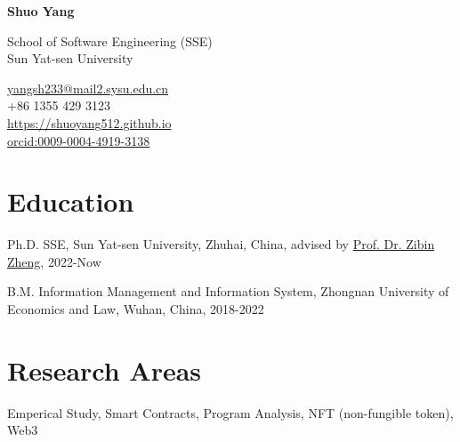 \documentclass[12pt,letterpaper]{report}
\newcommand{\myname}{Shuo Yang}
\newcommand{\namefont}[1]{{\normalfont\bfseries\Huge{#1}}}
\newcommand{\listitemspace}{0.25em}
\renewenvironment{itemize}
{\begin{list}{}{\setlength{\leftmargin}{0em}
                \setlength{\parskip}{0em}
                \setlength{\itemsep}{\listitemspace}
                \setlength{\parsep}{\listitemspace}}}
{\end{list}}
\begin{document}
    \raggedright{}

    \namefont{\myname}

    \vspace{1em}
    \begin{minipage}[t]{0.700\textwidth}
        School of Software Engineering (SSE)\\
        Sun Yat-sen University
    \end{minipage}
    \begin{minipage}[t]{0.295\textwidth}
        \flushright{}
        \href{yangsh233@mail2.sysu.edu.cn}{yangsh233@mail2.sysu.edu.cn} \\
        +86 1355 429 3123 \\
        \href{https://shuoyang512.github.io}{https://shuoyang512.github.io}\\
        \href{https://orcid.org/0009-0004-4919-3138}{orcid:0009-0004-4919-3138}
    \end{minipage}

    \section*{Education}
    
    \begin{tablist}
      \item[Ph.D.] \tab{}SSE, Sun Yat-sen University, Zhuhai, China, advised by \href{http://www.zibinzheng.com/cv}{Prof. Dr. Zibin Zheng}, 2022-Now
      \item[B.M.] \tab{}Information Management and Information System, Zhongnan University of Economics and Law, Wuhan, China, 2018-2022
    \end{tablist}
    
    \section*{Research Areas}
    \begin{itemize}
      \item Emperical Study, Smart Contracts, Program Analysis, NFT (non-fungible token), Web3
    \end{itemize}
    
\end{document}
